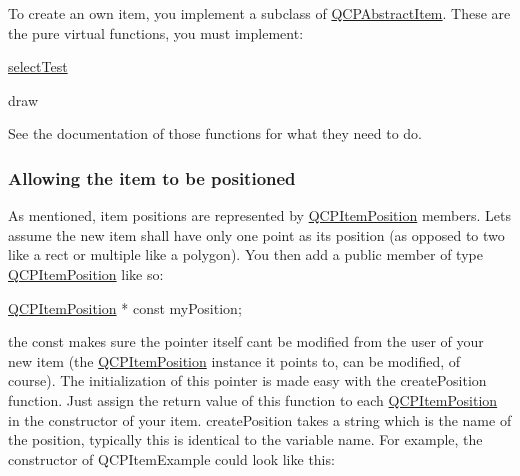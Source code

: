 To create an own item, you implement a subclass of \mbox{\hyperlink{class_q_c_p_abstract_item}{Q\+C\+P\+Abstract\+Item}}. These are the pure virtual functions, you must implement\+: \begin{DoxyItemize}
\item \mbox{\hyperlink{class_q_c_p_abstract_item_a96d522d10ffc0413b9a366c6f7f0476b}{select\+Test}} \item draw\end{DoxyItemize}
See the documentation of those functions for what they need to do.\hypertarget{class_q_c_p_abstract_item_items-positioning}{}\subsubsection{Allowing the item to be positioned}\label{class_q_c_p_abstract_item_items-positioning}
As mentioned, item positions are represented by \mbox{\hyperlink{class_q_c_p_item_position}{Q\+C\+P\+Item\+Position}} members. Let\textquotesingle{}s assume the new item shall have only one point as its position (as opposed to two like a rect or multiple like a polygon). You then add a public member of type \mbox{\hyperlink{class_q_c_p_item_position}{Q\+C\+P\+Item\+Position}} like so\+:


\begin{DoxyCode}
\mbox{\hyperlink{class_q_c_p_item_position}{QCPItemPosition}} * \textcolor{keyword}{const} myPosition;
\end{DoxyCode}


the const makes sure the pointer itself can\textquotesingle{}t be modified from the user of your new item (the \mbox{\hyperlink{class_q_c_p_item_position}{Q\+C\+P\+Item\+Position}} instance it points to, can be modified, of course). The initialization of this pointer is made easy with the create\+Position function. Just assign the return value of this function to each \mbox{\hyperlink{class_q_c_p_item_position}{Q\+C\+P\+Item\+Position}} in the constructor of your item. create\+Position takes a string which is the name of the position, typically this is identical to the variable name. For example, the constructor of Q\+C\+P\+Item\+Example could look like this\+:


